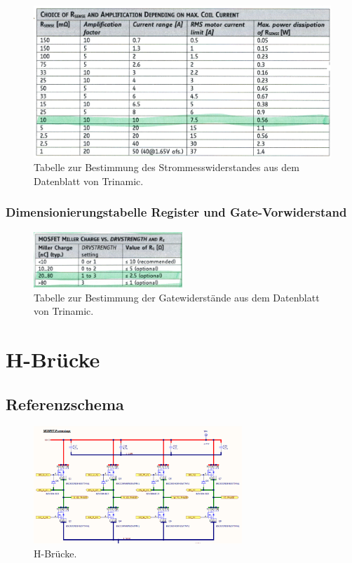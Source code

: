 \begin{appendix}
\begin{figure}[h!]
	\centering
	\includegraphics[width=\textwidth]{graphics/Tabelle_Shunts.png}
	\caption{Tabelle zur Bestimmung des Strommesswiderstandes aus dem Datenblatt von Trinamic.}
	\label{fig:Tabelle_Shunts}
\end{figure}

\subsubsection{Dimensionierungstabelle Register und Gate-Vorwiderstand}

\begin{figure}[h!]
	\centering
	\includegraphics[width=0.5\textwidth]{graphics/Tabelle_Gatewiderstaende.png}
	\caption{Tabelle zur Bestimmung der Gatewiderstände aus dem Datenblatt von Trinamic.}
	\label{fig:Tabelle_Gatewiderstaende}
\end{figure}

\newpage

\section{H-Brücke}\label{Appendix:H_Bruecke}

\subsection{Referenzschema}

\begin{figure}[h!]
	\centering
	\includegraphics[width=0.7\textwidth]{graphics/Referenzschema_10A70V}
	\caption{H-Brücke.}
	\label{fig:Schema_H_Bruecke_und_BLDC_Ref}
\end{figure}

\end{appendix}